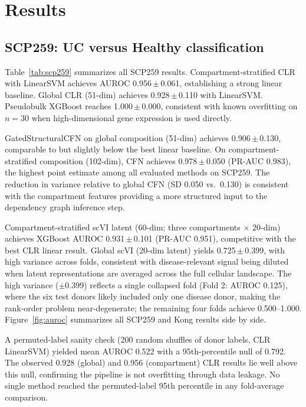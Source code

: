 \documentclass[11pt,letterpaper]{article}
\begin{document}
\section{Results}

\subsection{SCP259: UC versus Healthy classification}

Table~\ref{tab:scp259} summarizes all SCP259 results. Compartment-stratified
CLR with LinearSVM achieves AUROC 0.956\,$\pm$\,0.061, establishing a strong
linear baseline. Global CLR (51-dim) achieves 0.928\,$\pm$\,0.110 with
LinearSVM. Pseudobulk XGBoost reaches 1.000\,$\pm$\,0.000, consistent with
known overfitting on $n=30$ when high-dimensional gene expression is used
directly.

GatedStructuralCFN on global composition (51-dim) achieves
0.906\,$\pm$\,0.130, comparable to but slightly below the best linear baseline.
On compartment-stratified composition (102-dim), CFN achieves
0.978\,$\pm$\,0.050 (PR-AUC 0.983), the highest point estimate among all
evaluated methods on SCP259. The reduction in variance relative to global CFN
(SD 0.050 vs.\ 0.130) is consistent with the compartment features providing a
more structured input to the dependency graph inference step.

Compartment-stratified scVI latent (60-dim; three compartments $\times$ 20-dim) achieves XGBoost AUROC
0.931\,$\pm$\,0.101 (PR-AUC 0.951), competitive with the best CLR linear
result. Global scVI (20-dim latent) yields 0.725\,$\pm$\,0.399, with high variance
across folds, consistent with disease-relevant signal being diluted when latent
representations are averaged across the full cellular landscape.
The high variance ($\pm$0.399) reflects a single collapsed fold (Fold 2: AUROC 0.125), where the six test donors likely included only one disease donor, making the rank-order problem near-degenerate; the remaining four folds achieve 0.500--1.000.
Figure~\ref{fig:auroc} summarizes all SCP259 and Kong results side by side.

A permuted-label sanity check (200 random shuffles of donor labels, CLR LinearSVM)
yielded mean AUROC 0.522 with a 95th-percentile null of 0.792. The observed
0.928 (global) and 0.956 (compartment) CLR results lie well above this null,
confirming the pipeline is not overfitting through data leakage. No single method
reached the permuted-label 95th percentile in any fold-average comparison.
\end{document}
